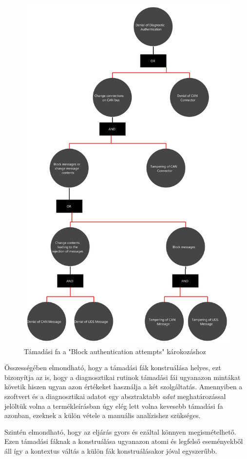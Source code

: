 \begin{figure}[!ht]
	\centering
	\includegraphics[width=120mm, keepaspectratio]{figures/AT-SECDIAG-02.png}
	\caption{Támadási fa a "Block authentication attempts" károkozáshoz} 
	\label{fig:ff_block_auth}
\end{figure}

Összességében elmondható, hogy a támadási fák konstruálása helyes, ezt bizonyítja az is, hogy a diagnosztikai rutinok támadási fái ugyanazon mintákat követik hiszen ugyan azon értékeket használja a két szolgáltatás. Amennyiben a szoftvert és a diagnosztikai adatot egy absztraktabb \textit{adat} meghatározással jelöltük volna a termékleírásban úgy elég lett volna kevesebb támadási fa azonban, ezeknek a külön vétele a manuális analízishez szükséges.

Szintén elmondható, hogy az eljárás gyors és ezáltal könnyen megismételhető. Ezen támadási fáknak a konstruálása ugyanazon atomi és legfelső eseményekből áll így a kontextus váltás a külön fák konstruálásakor jóval egyszerűbb.


